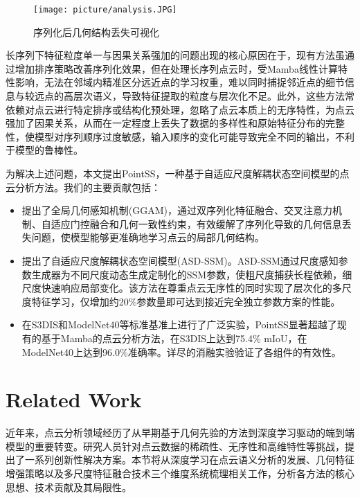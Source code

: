 \documentclass[preprint,12pt]{elsarticle}
\begin{document}
\begin{figure}[htbp]
	\centering
	\texttt{[image: picture/analysis.JPG]}
	\caption{序列化后几何结构丢失可视化}
	\label{fig:analysis}
\end{figure}

长序列下特征粒度单一与因果关系强加的问题出现的核心原因在于，现有方法虽通过增加排序策略改善序列化效果，但在处理长序列点云时，受Mamba线性计算特性影响，无法在邻域内精准区分远近点的学习权重，难以同时捕捉邻近点的细节信息与较远点的高层次语义，导致特征提取的粒度与层次化不足。此外，这些方法常依赖对点云进行特定排序或结构化预处理，忽略了点云本质上的无序特性，为点云强加了因果关系，从而在一定程度上丢失了数据的多样性和原始特征分布的完整性，使模型对序列顺序过度敏感，输入顺序的变化可能导致完全不同的输出，不利于模型的鲁棒性。

为解决上述问题，本文提出PointSS，一种基于自适应尺度解耦状态空间模型的点云分析方法。我们的主要贡献包括：

\begin{itemize}
	\item 提出了全局几何感知机制(GGAM)，通过双序列化特征融合、交叉注意力机制、自适应门控融合和几何一致性约束，有效缓解了序列化导致的几何信息丢失问题，使模型能够更准确地学习点云的局部几何结构。
	
	\item 提出了自适应尺度解耦状态空间模型(ASD-SSM)。ASD-SSM通过尺度感知参数生成器为不同尺度动态生成定制化的SSM参数，使粗尺度捕获长程依赖，细尺度快速响应局部变化。该方法在尊重点云无序性的同时实现了层次化的多尺度特征学习，仅增加约20\%参数量即可达到接近完全独立参数方案的性能。
	
	\item 在S3DIS和ModelNet40等标准基准上进行了广泛实验，PointSS显著超越了现有的基于Mamba的点云分析方法，在S3DIS上达到75.4\% mIoU，在ModelNet40上达到96.0\%准确率。详尽的消融实验验证了各组件的有效性。
\end{itemize}





\section{Related Work}
近年来，点云分析领域经历了从早期基于几何先验的方法到深度学习驱动的端到端模型的重要转变。研究人员针对点云数据的稀疏性、无序性和高维特性等挑战，提出了一系列创新性解决方案。本节将从深度学习在点云语义分析的发展、几何特征增强策略以及多尺度特征融合技术三个维度系统梳理相关工作，分析各方法的核心思想、技术贡献及其局限性。
\end{document}
